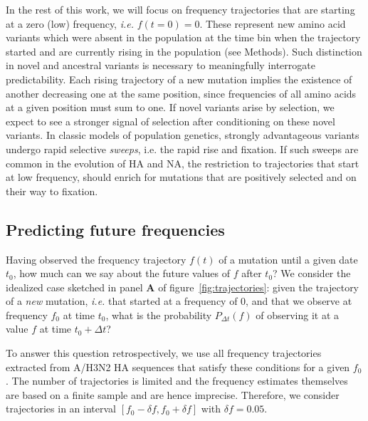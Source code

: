 \documentclass[reprint,amsmath,amssymb,superscriptaddress,showpacs,pre]{revtex4-1}
\begin{document}
In the rest of this work, we will focus on frequency trajectories that are starting at a zero (low) frequency, \emph{i.e.} $f(t=0)=0$. 
These represent new amino acid variants which were absent in the population at the time bin when the trajectory started and are currently rising in the population (see Methods).
Such distinction in novel and ancestral variants is necessary to meaningfully interrogate predictability.
Each rising trajectory of a new mutation implies the existence of another decreasing one at the same position, since frequencies of all amino acids at a given position must sum to one. 
If novel variants arise by selection, we expect to see a stronger signal of selection after conditioning on these novel variants. 
In classic models of population genetics, strongly advantageous variants undergo rapid selective \emph{sweeps}, i.e. the rapid rise and fixation. 
If such sweeps are common in the evolution of HA and NA, the restriction to trajectories that start at low frequency, should enrich for mutations that are positively selected and on their way to fixation.

\subsection*{Predicting future frequencies}
Having observed the frequency trajectory $f(t)$ of a mutation until a given date $t_0$, how much can we say about the future values of $f$ after $t_0$? 
We consider the idealized case sketched in panel \textbf{A} of figure~\ref{fig:trajectories}: given the trajectory of a \emph{new} mutation, \emph{i.e.} that started at a frequency of 0, and that we observe at frequency $f_0$ at time $t_0$, what is the probability $P_{\Delta t}(f)$ of observing it at a value $f$ at time $t_0 + \Delta t$? 

To answer this question retrospectively, we use all frequency trajectories extracted from A/H3N2 HA sequences that satisfy these conditions for a given $f_0$.  The number of trajectories is limited and the frequency estimates themselves are based on a finite sample and are hence imprecise. 
Therefore, we consider trajectories in an interval $[f_0-\delta f, f_0+\delta f]$ with $\delta f = 0.05$. 
\end{document}
